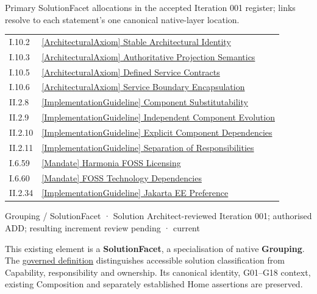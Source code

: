 Primary SolutionFacet allocations in the accepted Iteration 001 register; links resolve to each statement’s one canonical native-layer location.\par
\begin{longtable}{p{.22\linewidth}p{.73\linewidth}}
I.10.2 & \hyperref[element:86ecebbf65fc46af9763c96840342823]{[ArchitecturalAxiom] Stable Architectural Identity} \\
I.10.3 & \hyperref[element:d8ae43c850a646d485e6aba6c41a88e2]{[ArchitecturalAxiom] Authoritative Projection Semantics} \\
I.10.5 & \hyperref[element:b7d07bb4ec064272898d2f0189cffefd]{[ArchitecturalAxiom] Defined Service Contracts} \\
I.10.6 & \hyperref[element:376363587388401194ff967b0fe80a5a]{[ArchitecturalAxiom] Service Boundary Encapsulation} \\
II.2.8 & \hyperref[element:d4864b46c56e455189e418f3eaffec5c]{[ImplementationGuideline] Component Substitutability} \\
II.2.9 & \hyperref[element:c532bca066db4c419ccff5c52899af2a]{[ImplementationGuideline] Independent Component Evolution} \\
II.2.10 & \hyperref[element:2c21d1a175fb4c1486f6a91830838cde]{[ImplementationGuideline] Explicit Component Dependencies} \\
II.2.11 & \hyperref[element:8983e2a7c2814c9c99aa1f81eaabe9bd]{[ImplementationGuideline] Separation of Responsibilities} \\
I.6.59 & \hyperref[element:40880a1432ab4848ab5278839620a406]{[Mandate] Harmonia FOSS Licensing} \\
I.6.60 & \hyperref[element:13c56fcda53c406494561c883f32fc1c]{[Mandate] FOSS Technology Dependencies} \\
II.2.34 & \hyperref[element:17ae70b671b5451a812df11d59ff6e1c]{[ImplementationGuideline] Jakarta EE Preference} \\
\end{longtable}
\label{element:8bf2a60efafc4caf89ed9744adfb628d}
{\small Grouping / SolutionFacet · Solution Architect-reviewed Iteration 001; authorised ADD; resulting increment review pending · current}\par

This existing element is a \textbf{SolutionFacet}, a specialisation of native
\textbf{Grouping}. The \href{\detokenize{../../../../../../../governance/continuum-representation.md#solutionfacet-classification--1119-candidate}}{governed definition}
distinguishes accessible solution classification from Capability, responsibility
and ownership. Its canonical identity, G01–G18 context, existing Composition
and separately established Home assertions are preserved.



